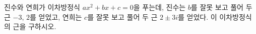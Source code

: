 진수와 연희가 이차방정식 $ax^2+bx+c=0$을 푸는데, 진수는 $b$를 잘못 보고 풀어 두 근 $-3$, $2$를 얻었고, 연희는 $c$를 잘못 보고 풀어 두 근 $2\pm 3i$를 얻었다. 이 이차방정식의 근을 구하시오. 
